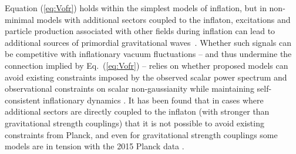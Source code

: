 
Equation (\ref{eq:Vofr}) holds within the simplest models of inflation, but in non-minimal models with additional sectors coupled to the inflaton, excitations and particle production associated with other fields during inflation can lead to additional sources of primordial gravitational waves~\cite{Cook:2011hg,Senatore:2011sp,Barnaby:2012xt}. Whether such signals can be competitive with inflationary vacuum fluctuations -- and thus undermine the connection implied by Eq.~(\ref{eq:Vofr}) -- relies on whether proposed models can avoid existing constraints imposed by the observed scalar power spectrum and observational constraints on scalar non-gaussianity while maintaining self-consistent inflationary dynamics \cite{Barnaby:2012xt,Meerburg:2012id,Ferreira:2014zia,Mirbabayi:2014jqa,Ozsoy:2014sba}. It has been found that in cases where additional sectors are directly coupled to the inflaton (with stronger than gravitational strength couplings) that it is not possible to avoid existing constraints from Planck, and even for gravitational strength 
couplings some models are in tension with the 2015 Planck data \cite{Ozsoy:2014sba,Mirbabayi:2014jqa}. 

